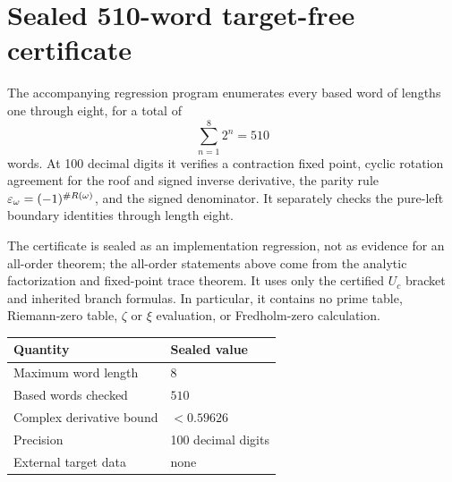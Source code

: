 \section{Sealed 510-word target-free certificate}
The accompanying regression program enumerates every based word of lengths
one through eight, for a total of
\[
 \sum_{n=1}^{8}2^n=510
\]
words. At 100 decimal digits it verifies a contraction fixed point, cyclic
rotation agreement for the roof and signed inverse derivative, the parity
rule \(\varepsilon_\omega=(-1)^{\#R(\omega)}\), and the signed denominator.
It separately checks the pure-left boundary identities through length eight.

The certificate is sealed as an implementation regression, not as evidence
for an all-order theorem; the all-order statements above come from the
analytic factorization and fixed-point trace theorem. It uses only the
certified \(U_c\) bracket and inherited branch formulas. In particular, it
contains no prime table, Riemann-zero table, \(\zeta\) or \(\xi\) evaluation,
or Fredholm-zero calculation.

\begin{center}
\begin{tabular}{@{}ll@{}}
\toprule
Quantity & Sealed value \\
\midrule
Maximum word length & \(8\) \\
Based words checked & \(510\) \\
Complex derivative bound & \(<0.59626\) \\
Precision & 100 decimal digits \\
External target data & none \\
\bottomrule
\end{tabular}
\end{center}
